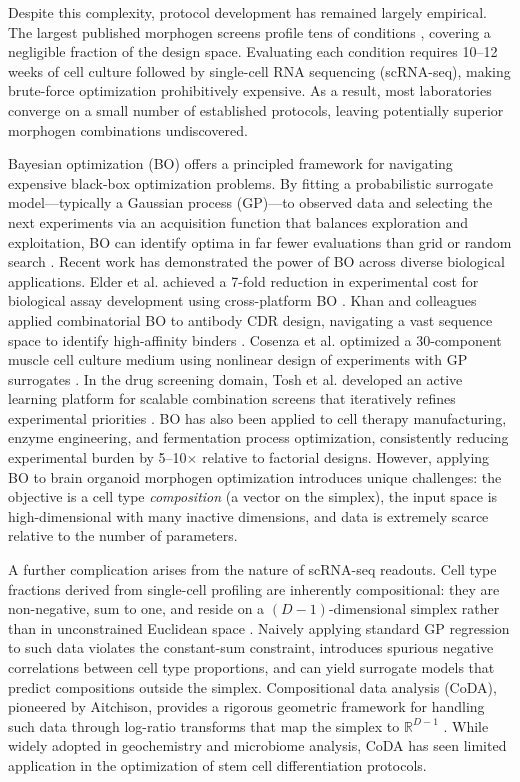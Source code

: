 \documentclass[times,twoside]{zHenriquesLab-StyleBioRxiv}
\newcommand{\Real}{\mathbb{R}}
\begin{document}
Despite this complexity, protocol development has remained largely empirical. The largest published morphogen screens profile tens of conditions \cite{Amin2024, SanchisCalleja2025}, covering a negligible fraction of the design space. Evaluating each condition requires 10--12 weeks of cell culture followed by single-cell RNA sequencing (scRNA-seq), making brute-force optimization prohibitively expensive. As a result, most laboratories converge on a small number of established protocols, leaving potentially superior morphogen combinations undiscovered.

Bayesian optimization (BO) offers a principled framework for navigating expensive black-box optimization problems. By fitting a probabilistic surrogate model---typically a Gaussian process (GP)---to observed data and selecting the next experiments via an acquisition function that balances exploration and exploitation, BO can identify optima in far fewer evaluations than grid or random search \cite{Elder2021bo, Khan2023}. Recent work has demonstrated the power of BO across diverse biological applications. Elder et al. achieved a 7-fold reduction in experimental cost for biological assay development using cross-platform BO \cite{Elder2021bo}. Khan and colleagues applied combinatorial BO to antibody CDR design, navigating a vast sequence space to identify high-affinity binders \cite{Khan2023}. Cosenza et al. optimized a 30-component muscle cell culture medium using nonlinear design of experiments with GP surrogates \cite{Cosenza2021}. In the drug screening domain, Tosh et al. developed an active learning platform for scalable combination screens that iteratively refines experimental priorities \cite{Tosh2025batchie}. BO has also been applied to cell therapy manufacturing, enzyme engineering, and fermentation process optimization, consistently reducing experimental burden by 5--10$\times$ relative to factorial designs. However, applying BO to brain organoid morphogen optimization introduces unique challenges: the objective is a cell type \emph{composition} (a vector on the simplex), the input space is high-dimensional with many inactive dimensions, and data is extremely scarce relative to the number of parameters.

A further complication arises from the nature of scRNA-seq readouts. Cell type fractions derived from single-cell profiling are inherently compositional: they are non-negative, sum to one, and reside on a $(D{-}1)$-dimensional simplex rather than in unconstrained Euclidean space \cite{Aitchison1986}. Naively applying standard GP regression to such data violates the constant-sum constraint, introduces spurious negative correlations between cell type proportions, and can yield surrogate models that predict compositions outside the simplex. Compositional data analysis (CoDA), pioneered by Aitchison, provides a rigorous geometric framework for handling such data through log-ratio transforms that map the simplex to $\Real^{D-1}$ \cite{Aitchison1986}. While widely adopted in geochemistry and microbiome analysis, CoDA has seen limited application in the optimization of stem cell differentiation protocols.
\end{document}
